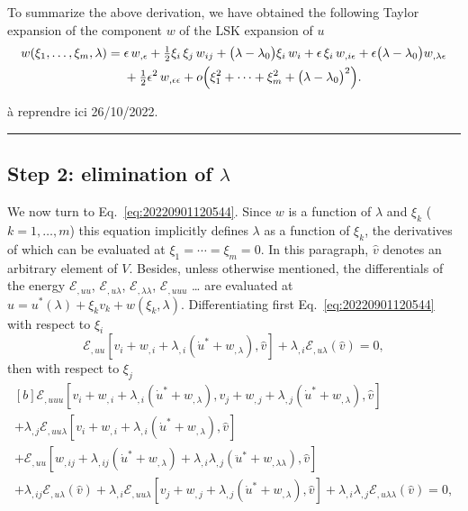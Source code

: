 \documentclass[12pt, final]{scrartcl}
\theoremstyle{definition}
\newcommand{\E}{\mathcal E}
\begin{document}
To summarize the above derivation, we have obtained the following Taylor expansion of the component $w$ of the LSK
expansion of $u$
\begin{equation}
  \begin{aligned}[b]
    w(\xi_1, \ldots, \xi_m, \lambda) ={}& \epsilon \, w_{,\epsilon} + \tfrac{1}{2} \xi_i \, \xi_j \, w_{ij} + \bigl( \lambda - \lambda_0 \bigr) \xi_i \, w_i + \epsilon \, \xi_i \, w_{,i\epsilon} + \epsilon \bigl( \lambda - \lambda_0\bigr) w_{,\lambda\epsilon}\\
    &+ \tfrac{1}{2} \epsilon^2 \, w_{,\epsilon\epsilon} + o\Bigl(\xi_1^2 + \cdots + \xi_m^2 + \bigl(\lambda - \lambda_0\bigr)^2\Bigr).
  \end{aligned}
\end{equation}

à reprendre ici 26/10/2022.

\hrule

\subsection{Step 2: elimination of \(λ\)}
\label{sec:20221020140252}

We now turn to Eq.~\eqref{eq:20220901120544}. Since $w$ is a function of $\lambda$ and $\xi_k$ ($k = 1, \ldots, m$) this
equation implicitly defines $\lambda$ as a function of $\xi_k$, the derivatives of which can be evaluated at
$\xi_1 = \cdots = \xi_m = 0$. In this paragraph, $\hat{v}$ denotes an arbitrary element of $V$. Besides, unless
otherwise mentioned, the differentials of the energy $\E_{,uu}$, $\E_{,u\lambda}$, $\E_{,\lambda\lambda}$, $\E_{,uuu}$
\dots{} are evaluated at $u = u^\ast(\lambda) + \xi_k v_k + w(\xi_k, \lambda)$. Differentiating first
Eq.~\eqref{eq:20220901120544} with respect to $\xi_i$
\begin{equation}
  \label{eq:20220901121940}
  \E_{,uu}[v_i + w_{,i} + \lambda_{,i} (\dot{u}^\ast + w_{,\lambda}), \hat{v}] + \lambda_{, i} \E_{,u\lambda}(\hat{v}) = 0,
\end{equation}
then with respect to $\xi_j$
\begin{equation}
  \label{eq:20220901125230}
  \begin{gathered}[b]
    \E_{,uuu}[v_i + w_{,i} + \lambda_{,i} (\dot{u}^\ast + w_{,\lambda}), v_j + w_{,j} + \lambda_{,j} (\dot{u}^\ast + w_{,\lambda}), \hat{v}]\\
    + \lambda_{,j}\E_{,uu\lambda}[v_i + w_{,i} + \lambda_{,i} (\dot{u}^\ast + w_{,\lambda}), \hat{v}]\\
    + \E_{,uu}[w_{,ij} + \lambda_{,ij} (\dot{u}^\ast + w_{,\lambda}) + \lambda_{,i}\lambda_{,j} (\ddot{u}^\ast + w_{,\lambda\lambda}), \hat{v}]\\
    + \lambda_{, ij} \E_{,u\lambda}(\hat{v}) + \lambda_{, i} \E_{,uu\lambda}[v_j + w_{,j} + \lambda_{,j} (\dot{u}^\ast + w_{,\lambda}), \hat{v}] + \lambda_{,i} \lambda_{,j} \E_{,u\lambda\lambda}(\hat{v})= 0,
  \end{gathered}
\end{equation}
\end{document}
